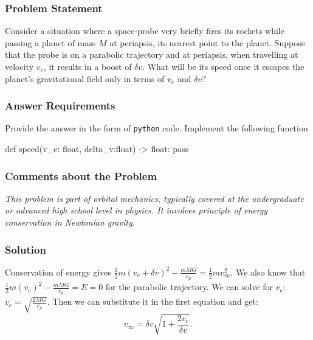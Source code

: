 \subsubsection*{Problem Statement}
Consider a situation where a space-probe very briefly fires its rockets while passing a planet of mass \(M\) at periapsis, its nearest point to the planet. Suppose that the probe is on a parabolic trajectory and at periapsis, when travelling at velocity $v_e$, it results in a boost of $\delta v$. What will be its speed once it escapes the planet's gravitational field only in terms of $v_e$ and $\delta v$?

\subsubsection*{Answer Requirements}
Provide the answer in the form of \texttt{python} code. Implement the following function
\begin{python}
def speed(v_e: float, delta_v:float) -> float:
    pass
\end{python}

\subsubsection*{Comments about the Problem}
\textit{This problem is part of orbital mechanics, typically covered at the undergraduate or advanced high school level in physics. It involves principle of energy conservation in Newtonian gravity.}

\subsubsection*{Solution}
Conservation of energy gives $\frac{1}{2}m(v_e+\delta v)^2-\frac{mMG}{r_p} = \frac{1}{2}mv^2_\infty$. We also know that $\frac{1}{2}m(v_e)^2-\frac{mMG}{r_p} = E = 0$ for the parabolic trajectory. We can solve for $v_e$: $v_e = \sqrt{\frac{2MG}{r_p}}$. Then we can substitute it in the first equation and get:
\begin{equation}
\boxed{v_\infty = \delta v\sqrt{1+\frac{2v_e}{\delta v}}}.
\end{equation}


